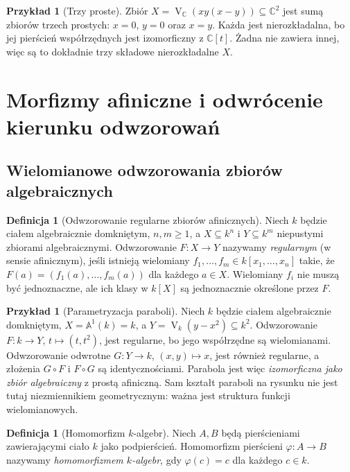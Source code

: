 \documentclass[11pt,a4paper,openany]{report}
\numberwithin{equation}{section}
\theoremstyle{plain}
\theoremstyle{definition}
\newtheorem{definicja}[twierdzenie]{Definicja}
\newtheorem{przyklad}[twierdzenie]{Przykład}
\theoremstyle{remark}
\newcommand{\C}{\mathbb C}
\newcommand{\A}{\mathbb A}
\newcommand{\V}{\operatorname V}
\begin{document}
\begin{przyklad}[Trzy proste]
Zbiór $X=\V_{\C}(xy(x-y))\subseteq\C^2$
jest sumą zbiorów trzech prostych: $x=0$, $y=0$ oraz $x=y$.
Każda jest nierozkładalna, bo jej pierścień współrzędnych
jest izomorficzny z $\C[t]$. Żadna nie zawiera innej,
więc są to dokładnie trzy składowe nierozkładalne $X$.
\end{przyklad}

\section{Morfizmy afiniczne i odwrócenie kierunku odwzorowań}

\subsection{Wielomianowe odwzorowania zbiorów algebraicznych}

\begin{definicja}[Odwzorowanie regularne zbiorów afinicznych]
Niech $k$ będzie ciałem algebraicznie domkniętym, $n,m\ge1$,
a $X\subseteq k^n$ i $Y\subseteq k^m$ niepustymi zbiorami algebraicznymi.
Odwzorowanie $F:X\to Y$ nazywamy \emph{regularnym} (w sensie
afinicznym), jeśli istnieją wielomiany
$f_1,\dots,f_m\in k[x_1,\dots,x_n]$ takie, że
$F(a)=(f_1(a),\dots,f_m(a))$ dla każdego $a\in X$.
Wielomiany $f_i$ nie muszą być jednoznaczne, ale ich klasy w $k[X]$
są jednoznacznie określone przez $F$.
\end{definicja}

\begin{przyklad}[Parametryzacja paraboli]
Niech $k$ będzie ciałem algebraicznie domkniętym,
$X=\A^1(k)=k$, a $Y=\V_k(y-x^2)\subseteq k^2$.
Odwzorowanie $F:k\to Y$, $t\mapsto(t,t^2)$, jest regularne,
bo jego współrzędne są wielomianami. Odwzorowanie odwrotne
$G:Y\to k$, $(x,y)\mapsto x$, jest również regularne,
a złożenia $G\circ F$ i $F\circ G$ są identycznościami.
Parabola jest więc \emph{izomorficzna jako zbiór algebraiczny}
z prostą afiniczną. Sam kształt paraboli na rysunku nie jest
tutaj niezmiennikiem geometrycznym: ważna jest struktura funkcji
wielomianowych.
\end{przyklad}

\begin{definicja}[Homomorfizm $k$-algebr]
Niech $A,B$ będą pierścieniami zawierającymi ciało $k$ jako podpierścień.
Homomorfizm pierścieni $\varphi:A\to B$ nazywamy
\emph{homomorfizmem $k$-algebr}, gdy $\varphi(c)=c$
dla każdego $c\in k$.
\end{definicja}
\end{document}
